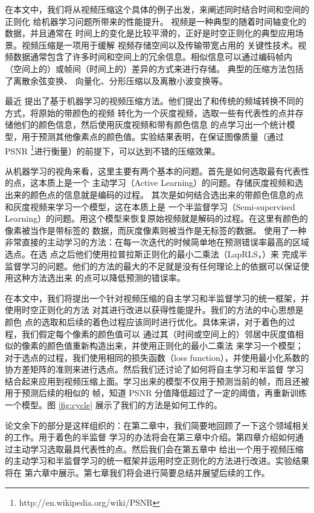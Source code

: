 在本文中，我们将从视频压缩这个具体的例子出发，来阐述同时结合时间和空间的正则化
给机器学习问题所带来的性能提升。
视频是一种典型的随着时间轴变化的数据，并且通常在
时间上的变化是比较平滑的，正好是时空正则化的典型应用场景。视频压缩是一项用于缓解
视频存储空间以及传输带宽占用的
关键性技术。视频数据通常包含了许多时间和空间上的冗余信息。相似信息可以通过编码帧内
（空间上的）或帧间（时间上的）差异的方式来进行存储。
典型的压缩方法包括了离散余弦变换、 向量化、分形压缩以及离散小波变换等。

最近 \cite{learning-to-compress-images}
提出了基于机器学习的视频压缩方法。他们提出了和传统的频域转换不同的方式，将原始的带颜色的视频
转化为一个灰度视频，选取一些有代表性的点并存储他们的颜色信息，然后使用灰度视频和带有颜色信息
的点学习出一个统计模型，用于预测其他像素点的颜色值。实验结果表明，在保证图像质量（通过
PSNR
\footnote{http://en.wikipedia.org/wiki/PSNR}进行衡量）的前提下，可以达到不错的压缩效果。

从机器学习的视角来看，这里主要有两个基本的问题。首先是如何选取最有代表性的点，这本质上是一个
主动学习（Active
Learning）的问题。存储灰度视频和选出来的颜色点的信息就是编码的过程。
其次是如何结合选出来的带颜色信息的点和灰度视频来学习一个模型，这在本质上是
一个半监督学习（Semi-supervised
Learning）的问题。用这个模型来恢复原始视频就是解码的过程。在这里有颜色的像素被当作是带标签的
数据，而灰度像素则被当作是无标签的数据。\cite{learning-to-compress-images}
使用了一种非常直接的主动学习的方法：在每一次迭代的时候简单地在预测错误率最高的区域选点。在选
点之后他们使用拉普拉斯正则化的最小二乘法（LapRLS，\cite{Manifold-Regularization-Journal}）来
完成半监督学习的问题。他们的方法的最大的不足就是没有任何理论上的依据可以保证使用这种方法选出来
的点可以降低预测的错误率。

在本文中，我们将提出一个针对视频压缩的自主学习和半监督学习的统一框架，并使用时空正则化的方法
对其进行改进以获得性能提升。我们的方法的中心思想是颜色
点的选取和后续的着色过程应该同时进行优化。具体来讲，对于着色的过程，我们假定每个像素的颜色值可以
通过其（时间或空间上的）邻居中灰度值相似的像素的颜色值重新构造出来，并使用正则化的最小二乘法
来学习一个模型；对于选点的过程，我们使用相同的损失函数（loss
function），并使用最小化系数的协方差矩阵的准则来进行选点。然后我们还讨论了如何将自主学习和半监督
学习结合起来应用到视频压缩上面。学习出来的模型不仅用于预测当前的帧，而且还被用于预测后续的相似的
帧，知道 PSNR 分值降低超过了一定的阈值，再重新训练一个模型。图
\ref{fig:cycle} 展示了我们的方法是如何工作的。

论文余下的部分是这样组织的：在第二章中，我们简要地回顾了一下这个领域相关的工作。用于着色的半监督
学习的办法将会在第三章中介绍。第四章介绍如何通过主动学习选取最具代表性的点。然后我们会在第五章中
给出一个用于视频压缩的主动学习和半监督学习的统一框架并运用时空正则化的方法进行改进。实验结果将在
第六章中展示。第七章我们将会进行简要总结并展望后续的工作。

